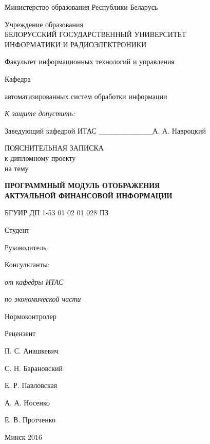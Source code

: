 \thispagestyle{empty}
\setlength{\parindent}{0ex} %

{\centering{}
  Министерство образования Республики Беларусь\par
}

\bigskip
{\centering{}
  Учреждение образования \\
  БЕЛОРУССКИЙ ГОСУДАРСТВЕННЫЙ УНИВЕРСИТЕТ \\
  ИНФОРМАТИКИ И РАДИОЭЛЕКТРОНИКИ
  \par
}

\bigskip
Факультет информационных технологий и управления

\smallskip
\parbox{\widthof{Факультет}}{Кафедра}
автоматизированных систем обработки информации

\vspace{\baselineskip}
\hfill
\begin{minipage}{.4\textwidth}
  {\raggedright{}
    \textit{К защите допустить:}

    \smallskip
    Заведующий кафедрой ИТАС
    \_\_\_\_\_\_\_\_\_\_А. А. Навроцкий\par
  }
\end{minipage}

\vspace{3\baselineskip}

{\centering{}
  ПОЯСНИТЕЛЬНАЯ ЗАПИСКА \\
  к дипломному проекту \\
  на тему\par
}

\bigskip
{\centering{}
  \textbf{ПРОГРАММНЫЙ МОДУЛЬ ОТОБРАЖЕНИЯ \\ АКТУАЛЬНОЙ ФИНАНСОВОЙ ИНФОРМАЦИИ}\par
}

\bigskip
{\centering{}
  БГУИР ДП 1-53 01 02 01 028 ПЗ \par
}

\vspace{5\baselineskip}

\begin{minipage}{.6\textwidth}
Студент

Руководитель

Консультанты:

\hspace{0.3em} \textit{от кафедры ИТАС}

\hspace{0.3em} \textit{по экономической части}

Нормоконтролер

Рецензент
\end{minipage}
\hfill
\begin{minipage}{.3\textwidth}
  П. С. Анашкевич

  С. Н. Барановский

  \vspace{\baselineskip}
  Е. Р. Павловская

  А. А. Носенко

  Е. В. Протченко

  \color{white}{???}
\end{minipage}

\vfill

{\centering{}
  Минск 2016\par
}

\setlength{\parindent}{1.25cm} %
